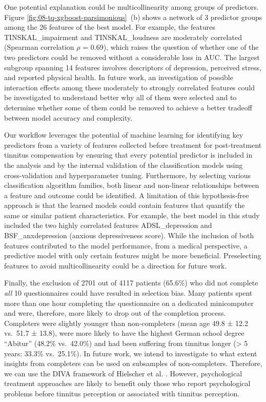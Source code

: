 \documentclass[
  oneside]{book}
\begin{document}
One potential explanation could be multicollinearity among groups of predictors.
Figure \ref{fig:08-tq-xgboost-parsimonious}~(b) shows a network of 3 predictor groups among the 26 features of the best model.
For example, the features TINSKAL\_impairment and TINSKAL\_loudness are moderately correlated (Spearman correlation \(\rho\) = 0.69), which raises the question of whether one of the two predictors could be removed without a considerable loss in AUC.
The largest subgroup spanning 14 features involves descriptors of depression, perceived stress, and reported physical health.
In future work, an investigation of possible interaction effects among these moderately to strongly correlated features could be investigated to understand better why all of them were selected and to determine whether some of them could be removed to achieve a better tradeoff between model accuracy and complexity.

Our workflow leverages the potential of machine learning for identifying key predictors from a variety of features collected before treatment for post-treatment tinnitus compensation by ensuring that every potential predictor is included in the analysis and by the internal validation of the classification models using cross-validation and hyperparameter tuning.
Furthermore, by selecting various classification algorithm families, both linear and non-linear relationships between a feature and outcome could be identified.
A limitation of this hypothesis-free approach is that the learned models could contain features that quantify the same or similar patient characteristics.
For example, the best model in this study included the two highly correlated features ADSL\_depression and BSF\_anxdepression (anxious depressiveness score).
While the inclusion of both features contributed to the model performance, from a medical perspective, a predictive model with only certain features might be more beneficial.
Preselecting features to avoid multicollinearity could be a direction for future work.

Finally, the exclusion of 2701 out of 4117 patients (65.6\%) who did not complete \emph{all} 10 questionnaires could have resulted in selection bias.
Many patients spent more than one hour completing the questionnaire on a dedicated minicomputer and were, therefore, more likely to drop out of the completion process.
Completers were slightly younger than non-completers (mean age 49.8 ± 12.2 vs.~51.7 ± 13.8), were more likely to have the highest German school degree ``Abitur'' (48.2\% vs.~42.0\%) and had been suffering from tinnitus longer (\textgreater{} 5 years: 33.3\% vs.~25.1\%).
In future work, we intend to investigate to what extent insights from completers can be used on subsamples of non-completers.
Therefore, we can use the DIVA framework of Hielscher et al. \autocite{Hielscher2018}.
However, psychological treatment approaches are likely to benefit only those who report psychological problems before tinnitus perception or associated with tinnitus perception.
\end{document}
